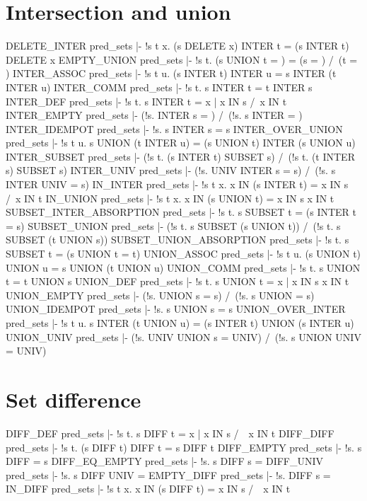 \section{Intersection and union}
\THEOREM DELETE\_INTER pred\_sets
|- !s t x. (s DELETE x) INTER t = (s INTER t) DELETE x
\ENDTHEOREM
\THEOREM EMPTY\_UNION pred\_sets
|- !s t. (s UNION t = {}) = (s = {}) /\ (t = {})
\ENDTHEOREM
\THEOREM INTER\_ASSOC pred\_sets
|- !s t u. (s INTER t) INTER u = s INTER (t INTER u)
\ENDTHEOREM
\THEOREM INTER\_COMM pred\_sets
|- !s t. s INTER t = t INTER s
\ENDTHEOREM
\THEOREM INTER\_DEF pred\_sets
|- !s t. s INTER t = {x | x IN s /\ x IN t}
\ENDTHEOREM
\THEOREM INTER\_EMPTY pred\_sets
|- (!s. {} INTER s = {}) /\ (!s. s INTER {} = {})
\ENDTHEOREM
\THEOREM INTER\_IDEMPOT pred\_sets
|- !s. s INTER s = s
\ENDTHEOREM
\THEOREM INTER\_OVER\_UNION pred\_sets
|- !s t u. s UNION (t INTER u) = (s UNION t) INTER (s UNION u)
\ENDTHEOREM
\THEOREM INTER\_SUBSET pred\_sets
|- (!s t. (s INTER t) SUBSET s) /\ (!s t. (t INTER s) SUBSET s)
\ENDTHEOREM
\THEOREM INTER\_UNIV pred\_sets
|- (!s. UNIV INTER s = s) /\ (!s. s INTER UNIV = s)
\ENDTHEOREM
\THEOREM IN\_INTER pred\_sets
|- !s t x. x IN (s INTER t) = x IN s /\ x IN t
\ENDTHEOREM
\THEOREM IN\_UNION pred\_sets
|- !s t x. x IN (s UNION t) = x IN s \/ x IN t
\ENDTHEOREM
\THEOREM SUBSET\_INTER\_ABSORPTION pred\_sets
|- !s t. s SUBSET t = (s INTER t = s)
\ENDTHEOREM
\THEOREM SUBSET\_UNION pred\_sets
|- (!s t. s SUBSET (s UNION t)) /\ (!s t. s SUBSET (t UNION s))
\ENDTHEOREM
\THEOREM SUBSET\_UNION\_ABSORPTION pred\_sets
|- !s t. s SUBSET t = (s UNION t = t)
\ENDTHEOREM
\THEOREM UNION\_ASSOC pred\_sets
|- !s t u. (s UNION t) UNION u = s UNION (t UNION u)
\ENDTHEOREM
\THEOREM UNION\_COMM pred\_sets
|- !s t. s UNION t = t UNION s
\ENDTHEOREM
\THEOREM UNION\_DEF pred\_sets
|- !s t. s UNION t = {x | x IN s \/ x IN t}
\ENDTHEOREM
\THEOREM UNION\_EMPTY pred\_sets
|- (!s. {} UNION s = s) /\ (!s. s UNION {} = s)
\ENDTHEOREM
\THEOREM UNION\_IDEMPOT pred\_sets
|- !s. s UNION s = s
\ENDTHEOREM
\THEOREM UNION\_OVER\_INTER pred\_sets
|- !s t u. s INTER (t UNION u) = (s INTER t) UNION (s INTER u)
\ENDTHEOREM
\THEOREM UNION\_UNIV pred\_sets
|- (!s. UNIV UNION s = UNIV) /\ (!s. s UNION UNIV = UNIV)
\ENDTHEOREM
\section{Set difference}
\THEOREM DIFF\_DEF pred\_sets
|- !s t. s DIFF t = {x | x IN s /\ ~x IN t}
\ENDTHEOREM
\THEOREM DIFF\_DIFF pred\_sets
|- !s t. (s DIFF t) DIFF t = s DIFF t
\ENDTHEOREM
\THEOREM DIFF\_EMPTY pred\_sets
|- !s. s DIFF {} = s
\ENDTHEOREM
\THEOREM DIFF\_EQ\_EMPTY pred\_sets
|- !s. s DIFF s = {}
\ENDTHEOREM
\THEOREM DIFF\_UNIV pred\_sets
|- !s. s DIFF UNIV = {}
\ENDTHEOREM
\THEOREM EMPTY\_DIFF pred\_sets
|- !s. {} DIFF s = {}
\ENDTHEOREM
\THEOREM IN\_DIFF pred\_sets
|- !s t x. x IN (s DIFF t) = x IN s /\ ~x IN t
\ENDTHEOREM
